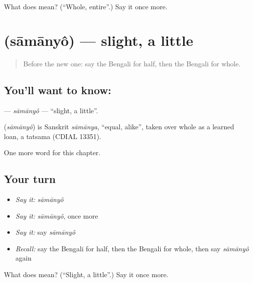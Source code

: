 \begin{tcolorbox}[breakable,colback=teal!4,colframe=teal!35!black,title={Before you move on}]
What does  mean? (\textquotedblleft{}Whole, entire\textquotedblright{}.) Say it once more.
\end{tcolorbox}
\section[\texorpdfstring{\bn{সামান্য} (sāmānyô)}{সামান্য (sāmānyô)}]{ (sāmānyô) — slight, a little}

\label{lesson:BN-C162-samanyo}



\begin{quote}
Before the new one: say the Bengali for half, then the Bengali for whole.
\end{quote}

\subsection*{You'll want to know: }
\textbf{} — \emph{sāmānyô} — \textquotedblleft{}slight, a little\textquotedblright{}.

\begin{cousinweb}
\textbf{} (\emph{sāmānyô}) is Sanskrit \emph{sāmānya}, \textquotedblleft{}equal, alike\textquotedblright{}, taken over whole as a learned loan, a tatsama (CDIAL 13351).
\end{cousinweb}

\begin{grammarlens}[title={What you've built}]
One more word for this chapter.
\end{grammarlens}

\subsection*{Your turn}
\begin{itemize}
\raggedright
  \item \emph{Say it:} \emph{sāmānyô}
  \item \emph{Say it:} \emph{sāmānyô}, once more
  \item \emph{Say it:} say \emph{sāmānyô}
  \item \emph{Recall:} say the Bengali for half, then the Bengali for whole, then say \emph{sāmānyô} again
\end{itemize}

\begin{tcolorbox}[breakable,colback=teal!4,colframe=teal!35!black,title={Before you move on}]
What does  mean? (\textquotedblleft{}Slight, a little\textquotedblright{}.) Say it once more.
\end{tcolorbox}
